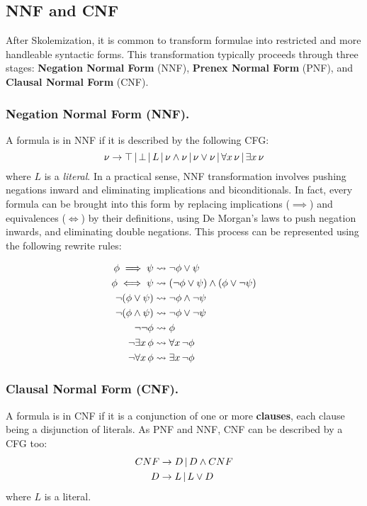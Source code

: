 \subsection{NNF and CNF}
After Skolemization, it is common to transform formulae into restricted and more handleable syntactic forms.  
This transformation typically proceeds through three stages:  
\textbf{Negation Normal Form} (NNF), \textbf{Prenex Normal Form} (PNF), and \textbf{Clausal Normal Form} (CNF).

\subsubsection{Negation Normal Form (NNF).}
A formula is in NNF if it is described by the following CFG\@:
\begin{equation}
  \nu \to \top \,|\, \bot \,|\, L \,|\, \nu \land \nu \,|\, \nu \lor \nu \,|\, \forall x \, \nu \,|\, \exists x \, \nu
\end{equation}
where \(L\) is a \textit{literal}.
In a practical sense, NNF transformation involves pushing negations inward and eliminating implications and biconditionals.
In fact, every formula can be brought into this form by replacing implications (\(\implies\)) and equivalences (\(\iff\)) by their definitions, using De Morgan's laws to push negation inwards, and eliminating double negations. This process can be represented using the following rewrite rules:

\begin{equation}
  \begin{aligned}
    \phi \implies \psi &\leadsto \neg \phi \lor \psi \\
    \phi \iff \psi &\leadsto (\neg \phi \lor \psi) \land (\phi \lor \neg \psi) \\
    \neg (\phi \lor \psi) &\leadsto \neg \phi \land \neg \psi \\
    \neg (\phi \land \psi) &\leadsto \neg \phi \lor \neg \psi \\
    \neg \neg \phi &\leadsto \phi \\
    \neg \exists x \, \phi &\leadsto \forall x \, \neg \phi \\
    \neg \forall x \, \phi &\leadsto \exists x \, \neg \phi
  \end{aligned}
\end{equation}

\subsubsection{Clausal Normal Form (CNF).}
A formula is in CNF if it is a conjunction of one or more \textbf{clauses}, each clause being a disjunction of literals.  
As PNF and NNF, CNF can be described by a CFG too:
\begin{equation}
  \begin{aligned}
    CNF &\to D \,|\, D \land CNF \\
      D &\to L \,|\, L \lor D
  \end{aligned}
\end{equation}
where \(L\) is a literal.


